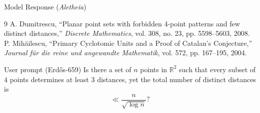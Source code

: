 \documentclass[11pt]{article}
\begin{document}
\begin{solution}{Model Response (\emph{Aletheia})}
\begin{thebibliography}{9}
 A. Dumitrescu, ``Planar point sets with forbidden 4-point patterns and few distinct distances,'' \textit{Discrete Mathematics}, vol. 308, no. 23, pp. 5598--5603, 2008.
 P. Mih\u{a}ilescu, ``Primary Cyclotomic Units and a Proof of Catalan's Conjecture,'' \textit{Journal f\"{u}r die reine und angewandte Mathematik}, vol. 572, pp. 167--195, 2004.
\end{thebibliography}
\end{solution}

\begin{problem}{User prompt (Erd\H{o}s-659)}
    Is there a set of $n$ points in $\mathbb{R}^2$ such that every subset of $4$ points determines at least $3$ distances, yet the total number of distinct distances is\[\ll \frac{n}{\sqrt{\log n}}?\]
\end{problem}
\end{document}
